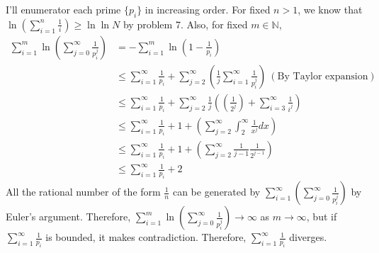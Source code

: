 \documentclass[12pt]{article}
\newenvironment{problem}[2][Problem]{\begin{trivlist}
\item[\hskip \labelsep {\bfseries #1}\hskip \labelsep {\bfseries #2.}]}{\end{trivlist}}
\begin{document}
\newpage
\begin{problem}{8}
\end{problem}
I'll enumerator each prime $\{p_i\}$ in increasing order. For fixed $n>1$, we know that $\ln \left(\sum\limits_{i=1}^n \frac{1}{i}\right)\geq \ln \ln N$ by problem 7. Also, for fixed $m\in \mathbb{N}$,
\begin{equation*}
\begin{split}
\sum\limits_{i=1}^m \ln \left(\sum\limits_{j=0}^\infty \frac{1}{p_i^j}\right)&=-\sum\limits_{i=1}^m \ln \left(1-\frac{1}{p_i}\right) \\
&\leq \sum\limits_{i=1}^\infty \frac{1}{p_i} + \sum\limits_{j=2}^\infty \left(\frac{1}{j}\sum\limits_{i=1}^\infty \frac{1}{p^j_i}\right)~(\textrm{By Taylor expansion}) \\
&\leq \sum\limits_{i=1}^\infty \frac{1}{p_i} + \sum\limits_{j=2}^\infty \frac{1}{j}\left(\left(\frac{1}{2^j}\right)+\sum\limits_{i=3}^\infty \frac{1}{i^j}\right) \\
&\leq \sum\limits_{i=1}^\infty \frac{1}{p_i} + 1+\left(\sum\limits_{j=2}^\infty \int_2^\infty \frac{1}{x^j} dx \right) \\
&\leq \sum\limits_{i=1}^\infty \frac{1}{p_i} + 1+\left(\sum\limits_{j=2}^\infty \frac{1}{j-1}\frac{1}{2^{j-1}}\right) \\
&\leq \sum\limits_{i=1}^\infty \frac{1}{p_i} + 2
\end{split}
\end{equation*}
All the rational number of the form $\frac{1}{n}$ can be generated by $\sum\limits_{i=1}^\infty\left(\sum\limits_{j=0}^\infty \frac{1}{p_i^j}\right)$ by Euler's argument. Therefore, $\sum\limits_{i=1}^m\ln\left(\sum\limits_{j=0}^\infty \frac{1}{p_i^j}\right)\rightarrow \infty$ as $m\rightarrow \infty$, but if $\sum\limits_{i=1}^\infty \frac{1}{p_i}$ is bounded, it makes contradiction. Therefore, $\sum\limits_{i=1}^\infty \frac{1}{p_i}$ diverges.
\end{document}
